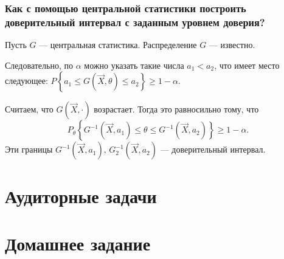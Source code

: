 \subsubsection*{Как с помощью центральной статистики построить доверительный интервал с заданным
                уровнем доверия?}

Пусть $G$ --- центральная статистика.
Распределение $G$ --- известно.

Следовательно, по $ \alpha $ можно указать такие числа $a_1 < a_2$, что имеет место следующее:
$P \left\{ a_1 \leq G \left( \vec{X}, \theta \right) \leq a_2 \right\} \geq
  1 - \alpha $.

Считаем, что $G \left( \vec{X}, \cdot \right) $ возрастает.
Тогда это равносильно тому,
что
$$P_{ \theta } \left\{
    G^{-1} \left( \vec{X}, a_1 \right) \leq \theta \leq G^{-1} \left( \vec{X}, a_2 \right)
  \right\}
  \geq 1 - \alpha.$$
Эти границы $G^{-1} \left( \vec{X}, a_1 \right), \, G_2^{-1} \left( \vec{X}, a_2 \right) $ ---
доверительный интервал.

\section*{Аудиторные задачи}

\section*{Домашнее задание}
